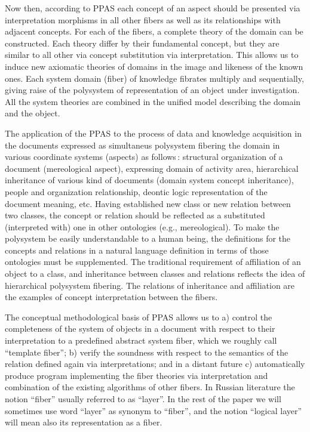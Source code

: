 \documentclass[conference]{IEEEtran}
\begin{document}
Now then, according to PPAS \cite{father} each concept of an aspect
should be presented via interpretation morphisms in all other fibers
as well as its relationships with adjacent concepts.  For each of the
fibers, a complete theory of the domain can be constructed.  Each
theory differ by their fundamental concept, but they are similar to
all other via concept substitution via interpretation.  This allows us
to induce new axiomatic theories of domains in the image and likeness
of the known ones.  Each system domain (fiber) of knowledge fibrates
multiply and sequentially, giving raise of the polysystem of
representation of an object under investigation.  All the system
theories are combined in the unified model describing the domain and
the object.

The application of the PPAS to the process of data and knowledge
acquisition in the documents expressed as simultaneus polysystem
fibering the domain in various coordinate systems (aspects) as
follows\,: structural organization of a document (mereological
aspect), expressing domain of activity area, hierarchical inheritance
of various kind of documents (domain system concept inheritance),
people and organization relationship, deontic logic representation of
the document meaning, etc.  Having established new class or new
relation between two classes, the concept or relation should be
reflected as a substituted (interpreted with) one in other ontologies
(e.g., mereological).  To make the polysystem be easily understandable
to a human being, the definitions for the concepts and relations in a
natural language definition in terms of those ontologies must be
supplemented.  The traditional requirement of affiliation of an object
to a class, and inheritance between classes and relations reflects the
idea of hierarchical polysystem fibering.  The relations of
inheritance and affiliation are the examples of concept interpretation
between the fibers.

The conceptual methodological basis of PPAS allows us to a) control
the completeness of the system of objects in a document with respect
to their interpretation to a predefined abstract system fiber, which
we roughly call ``template fiber''; b) verify the soundness with
respect to the semantics of the relation defined again via
interpretations; and in a distant future c) automatically produce
program implementing the fiber theories via interpretation and
combination of the existing algorithms of other fibers.  In Russian
literature the notion ``fiber'' usually referred to as ``layer''.  In
the rest of the paper we will sometimes use word ``layer'' as synonym
to ``fiber'', and the notion ``logical layer'' will mean also its
representation as a fiber.
\end{document}
